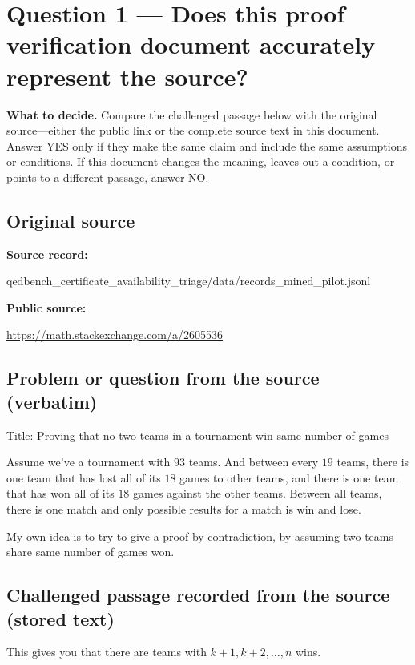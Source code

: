 \documentclass[11pt]{article}
\begin{document}
\section*{Question 1 --- Does this proof verification document accurately represent the source?}
\textbf{What to decide.} Compare the challenged passage below with the original source---either the public link or the complete source text in this document. Answer YES only if they make the same claim and include the same assumptions or conditions. If this document changes the meaning, leaves out a condition, or points to a different passage, answer NO.
\subsection*{Original source}
\textbf{Source record:}
\begin{Vsrc}
qedbench_certificate_availability_triage/data/records_mined_pilot.jsonl
\end{Vsrc}
\textbf{Public source:}\par
\url{https://math.stackexchange.com/a/2605536}\par
\subsection*{Problem or question from the source (verbatim)}
\begin{Vsrc}
Title: Proving that no two teams in a tournament win same number of games

Assume we've a tournament with $93$ teams. And between every $19$ teams, there is one team that has lost all of its $18$ games to other teams, and there is one team that has won all of its $18$ games against the other teams.
Between all teams, there is one match and only possible results for a match is win and lose.

My own idea is to try to give a proof by contradiction, by assuming two teams share same number of games won.
\end{Vsrc}
\subsection*{Challenged passage recorded from the source (stored text)}
\begin{Vsrc}
This gives you that there are teams with $k+1, k+2, \dots, n$ wins.
\end{Vsrc}
\end{document}
